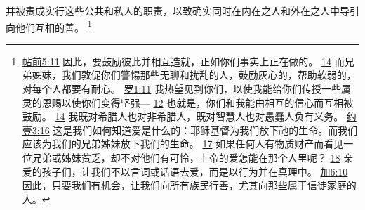 \documentclass[12pt, a4paper, oneside]{ctexart}
\begin{document}
	并被责成实行这些公共和私人的职责，以致确实同时在内在之人和外在之人中导引向他们互相的善。
	\footnote {
		\href{https://biblehub.com/1_thessalonians/5-11.htm}{帖前5:11} 因此，要鼓励彼此并相互造就，正如你们事实上正在做的。 
		\href{https://biblehub.com/1_thessalonians/5-14.htm}{14} 而兄弟姊妹，我们敦促你们警惕那些无聊和扰乱的人，鼓励灰心的，帮助软弱的，对每个人都要有耐心。
		\href{https://biblehub.com/romans/1-11.htm}{罗1:11} 我热望见到你们，以使我能给你们传授一些属灵的恩赐以使你们变得坚强---
		\href{https://biblehub.com/romans/1-12.htm}{12} 也就是，你们和我能由相互的信心而互相被鼓励。
		\href{https://biblehub.com/romans/1-14.htm}{14} 我既对希腊人也对非希腊人，既对智慧人也对愚蠢人负有义务。
		\href{https://biblehub.com/1_john/3-16.htm}{约壹3:16} 这是我们如何知道爱是什么的：耶稣基督为我们放下祂的生命。而我们应该为我们的兄弟姊妹放下我们的生命。
		\href{https://biblehub.com/1_john/3-17.htm}{17} 如果任何人有物质财产而看见一位兄弟或姊妹贫乏，却不对他们有可怜，上帝的爱怎能在那个人里呢？
		\href{https://biblehub.com/1_john/3-18.htm}{18} 亲爱的孩子们，让我们不以言词或话语去爱，而是以行为并在真理中。
		\href{https://biblehub.com/galatians/6-10.htm}{加6:10} 因此，只要我们有机会，让我们向所有族民行善，尤其向那些属于信徒家庭的人。
	}
\end{document}

